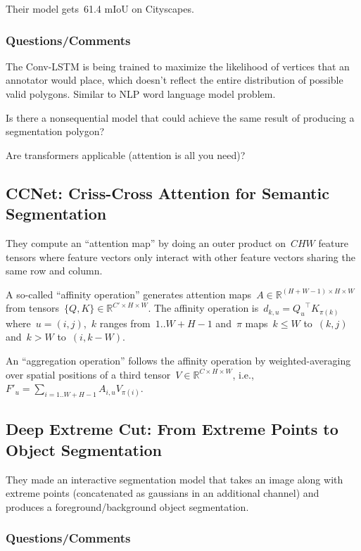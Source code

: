 \documentclass[a4paper, 12pt]{article}
\begin{document}
Their model gets~\num{61.4} mIoU on Cityscapes.


\subsubsection{Questions/Comments}

The Conv-LSTM is being trained to maximize the likelihood of vertices that an
annotator would place, which doesn't reflect the entire distribution of
possible valid polygons. Similar to NLP word language model problem.

Is there a nonsequential model that could achieve the same result of producing
a segmentation polygon?

Are transformers applicable (attention is all you need)?


\subsection{CCNet: Criss-Cross Attention for Semantic
            Segmentation~\cite{huang2018ccnet}}

They compute an ``attention map'' by doing an outer product on~$CHW$ feature
tensors where feature vectors only interact with other feature vectors sharing
the same row and column.

A so-called ``affinity operation'' generates attention
maps~$A\in \mathbb{R}^{(H + W - 1)\times H\times W}$ from tensors~$\{Q, K\} \in
\mathbb{R}^{C'\times H\times W}$.
The affinity operation is~$d_{k,u} = {Q_u}^\intercal K_{\pi(k)}$
where~$u = (i, j)$,~$k$ ranges from~$1..W + H - 1$ and~$\pi$ maps~$k \leq W$
to~$(k, j)$ and~$k > W$ to~$(i, k - W)$.

An ``aggregation operation'' follows the affinity operation by
weighted-averaging over spatial positions of a third
tensor~$V\in \mathbb{R}^{C\times H\times W}$,
i.e.,~$F'_u = \sum_{i = 1..W + H -1 }A_{i, u}V_{\pi(i)}$.


\subsection{Deep Extreme Cut: From Extreme Points to Object
            Segmentation~\cite{maninis2018deep}}

They made an interactive segmentation model that takes an image along with
extreme points (concatenated as gaussians in an additional channel) and
produces a foreground/background object segmentation.


\subsubsection{Questions/Comments}
\end{document}
